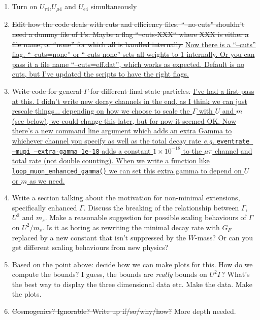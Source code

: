 \documentclass[11pt, a4paper]{article}
\newcommand{\newtext}[2]{\textcolor{#1}{\ul{#2}}}
\begin{document}
\begin{enumerate}
\item Turn on $U_{\tau 4}$,$U_{\mu 4}$ and $U_{e4}$ simultaneously

\item \sout{Edit how the code deals with cuts and efficiency files.
``--no-cuts" shouldn't need a dummy file of 1's. Maybe a flag ``--cuts-XXX``
where XXX is either a file name, or ``none'' for which all is handled
internally.} \newtext{PB}{Now there is a ``--cuts'' flag. ``--cuts=none'' or
``-cuts none'' sets all weights to 1 internally. Or you can pass it a file name
``--cuts=eff.dat'', which works as expected. Default is no cuts, but I've
updated the scripts to have the right flags.}

\item \sout{Write code for general $\Gamma$ for different final state
particles.} \newtext{PB}{I've had a first pass at this. I didn't write new
decay channels in the end, as I think we can just rescale things...  depending
on how we choose to scale the $\Gamma$ with $U$ and $m$ (see below), we could
change this later, but for now it seemed OK. Now there's a new command
line argument which adds an extra Gamma to whichever channel you specify as well 
as the total decay rate \emph{e.g.} \texttt{eventrate --mupi --extra-gamma 1e-18}
adds a constant $1\times10^{-18}$ to the $\mu\pi$ channel and total rate (not
double counting). When we write a function like \texttt{loop\_muon\_enhanced\_gamma()} we 
can set this extra gamma to depend on $U$ or $m$ as we need.} 

\item Write a section talking about the motivation for non-minimal extensions,
specifically enhanced $\Gamma$. Discuss the breaking of the relationship
between $\Gamma$, $U^2$ and $m_s$.  Make a reasonable suggestion for possible
scaling behaviours of $\Gamma$ on $U^2$/$m_s$. Is it as boring as rewriting the
minimal decay rate with $G_F$ replaced by a new constant that isn't suppressed
by the $W$-mass? Or can you get different scaling behaviours from new physics?

\item Based on the point above: decide how we can make plots for this. How do
we compute the bounds? I guess, the bounds are \emph{really} bounds on
$U^2\Gamma$? What's the best way to display the three dimensional data etc.
Make the data. Make the plots.

\item \sout{Cosmogenics? Ignorable? Write up if/so/why/how?} More depth needed.


\end{enumerate}



{}
\end{document}
